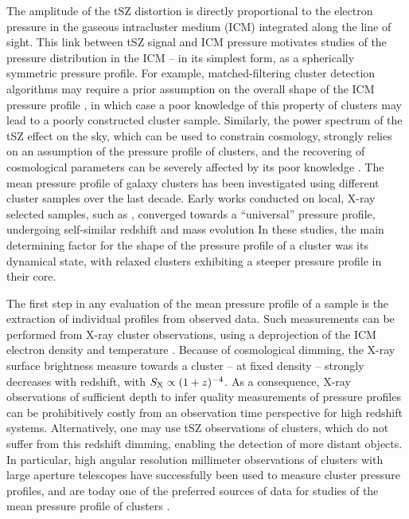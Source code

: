 The amplitude of the tSZ distortion is directly proportional to the electron pressure in the gaseous intracluster medium (ICM) integrated along the line of sight.
This link between tSZ signal and ICM pressure motivates studies of the pressure distribution in the ICM -- in its simplest form, as a spherically symmetric pressure profile.
For example, matched-filtering cluster detection algorithms may require a prior assumption on the overall shape of the ICM pressure profile \citep[\eg][]{melin_comparison_2012}, in which case a poor knowledge of this property of clusters may lead to a poorly constructed cluster sample.
Similarly, the power spectrum of the tSZ effect on the sky, which can be used to constrain cosmology, strongly relies on an assumption of the pressure profile of clusters, and the recovering of cosmological parameters can be severely affected by its poor knowledge \citep{ruppin_impact_2019}.
The mean pressure profile of galaxy clusters has been investigated using different cluster samples over the last decade.
Early works conducted on local, X-ray selected samples, such as \citet[][hereafter \aten]{arnaud_universal_2010}, converged towards a ``universal'' pressure profile, undergoing self-similar redshift and mass evolution \citep[see also \eg][]{battaglia_cluster_2012-1, planck_collaboration_planck_2013}
In these studies, the main determining factor for the shape of the pressure profile of a cluster was its dynamical state, with relaxed clusters exhibiting a steeper pressure profile in their core.
\textcolor{lightgray}{\lipsum[1]}

The first step in any evaluation of the mean pressure profile of a sample is the extraction of individual profiles from observed data.
Such measurements can be performed from X-ray cluster observations, using a deprojection of the ICM electron density and temperature \citep[see \eg][for reviews]{bohringer_x-ray_2010, bohringer_x-ray_2013}.
Because of cosmological dimming, the X-ray surface brightness measure towards a cluster -- at fixed density -- strongly decreases with redshift, with $S_{\rm X} \propto (1+z)^{-4}$.
As a consequence, X-ray observations of sufficient depth to infer quality measurements of pressure profiles can be prohibitively costly from an observation time perspective for high redshift systems.
Alternatively, one may use tSZ observations of clusters, which do not suffer from this redshift dimming, enabling the detection of more distant objects.
In particular, high angular resolution millimeter observations of clusters with large aperture telescopes have successfully been used to measure cluster pressure profiles, and are today one of the preferred sources of data for studies of the mean pressure profile of clusters \citep[\eg][]{mayet_cluster_2020, young_mean_2022, sayers_evolution_2022}.


